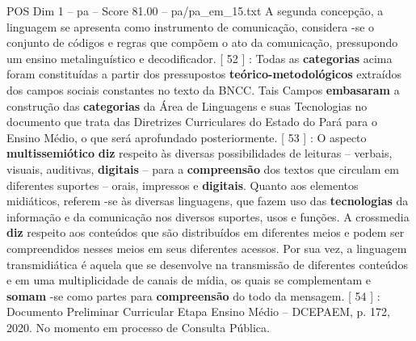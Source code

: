 \begin{textsample}{POS Dim 1 – pa – Score 81.00 – pa/pa\_em\_15.txt}
A segunda concepção, a linguagem se apresenta como instrumento de comunicação, considera -se o conjunto de códigos e regras que compõem o ato da comunicação, pressupondo um ensino metalinguístico e decodificador. [ 52 ] : Todas as \textbf{categorias} acima foram constituídas a partir dos pressupostos \textbf{teórico-metodológicos} extraídos dos campos sociais constantes no texto da BNCC.
Tais Campos \textbf{embasaram} a construção das \textbf{categorias} da Área de Linguagens e suas Tecnologias no documento que trata das Diretrizes Curriculares do Estado do Pará para o Ensino Médio, o que será aprofundado posteriormente. [ 53 ] : O aspecto \textbf{multissemiótico} \textbf{diz} respeito às diversas possibilidades de leituras – verbais, visuais, auditivas, \textbf{digitais} – para a \textbf{compreensão} dos textos que circulam em diferentes suportes – orais, impressos e \textbf{digitais}.
Quanto aos elementos midiáticos, referem -se às diversas linguagens, que fazem uso das \textbf{tecnologias} da informação e da comunicação nos diversos suportes, usos e funções.
A crossmedia \textbf{diz} respeito aos conteúdos que são distribuídos em diferentes meios e podem ser compreendidos nesses meios em seus diferentes acessos.
Por sua vez, a linguagem transmidiática é aquela que se desenvolve na transmissão de diferentes conteúdos e em uma multiplicidade de canais de mídia, os quais se complementam e \textbf{somam} -se como partes para \textbf{compreensão} do todo da mensagem. [ 54 ] : Documento Preliminar Curricular Etapa Ensino Médio – DCEPAEM, p. 172, 2020.
No momento em processo de Consulta Pública.

\end{textsample}
